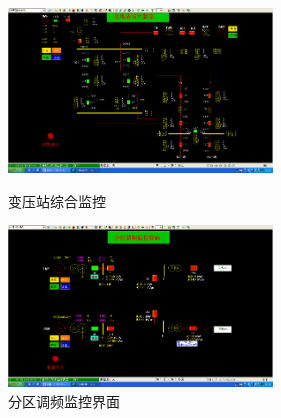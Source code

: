 \documentclass[a4paper]{ctexrep}
\begin{document}
                    \begin{figure}[htbp]
                        \centering
                        \begin{minipage}[t]{0.48\textwidth}
                            \centering
                            \includegraphics[width=7cm]{5.png}
                            \caption{变压站综合监控}
                        \end{minipage} 
                        \begin{minipage}[t]{0.48\textwidth}
                            \centering
                            \includegraphics[width=7cm]{6.png}
                            \caption{分区调频监控界面}
                        \end{minipage}
                    \end{figure}
\end{document}
